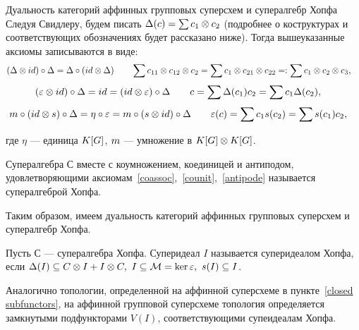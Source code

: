 \begin{subsection}{Дуальность категорий аффинных групповых суперсхем и супералгебр Хопфа}
  Следуя Свидлеру, будем писать $ \Delta(c) = \sum c_1 \otimes c_2 $ 
  (подробнее о коструктурах и соответствующих обозначениях будет рассказано ниже).
  Тогда вышеуказанные аксиомы записываются в виде:
  \begin{align*}
    (\Delta \otimes id) \circ \Delta = \Delta \circ (id \otimes \Delta) & \qquad
    \sum c_{11} \otimes c_{12} \otimes c_2 = \sum c_1 \otimes c_{21} \otimes c_{22} =: \sum c_1 \otimes c_2 \otimes c_3,
  \end{align*}
  \begin{align*}
    (\varepsilon \otimes id) \circ \Delta = id = (id \otimes \varepsilon) \circ \Delta & \qquad
    c = \sum \Delta(c_1) c_2 = \sum c_1 \Delta(c_2),
  \end{align*}
  \begin{align*}
    m \circ (id \otimes s) \circ \Delta = \eta \circ \varepsilon = m \circ (s \otimes id) \circ \Delta & \qquad
    \varepsilon (c) = \sum c_1 s(c_2) = \sum s(c_1) c_2,
  \end{align*}

  где $ \eta $ --- единица $ K[G] $, $ m $ --- умножение в $ K[G] \otimes K[G] $.

  \begin{definition}
    Супералгебра $ С $ вместе с коумножением, коединицей и антиподом,
    удовлетворяющими аксиомам~\ref{coassoc},~\ref{counit},~\ref{antipode}
    называется супералгеброй Хопфа.
  \end{definition}

  Таким образом, имеем дуальность категорий аффинных групповых суперсхем
  и супералгебр Хопфа.

  \begin{definition}
    Пусть $ С $ --- супералгебра Хопфа. Суперидеал $ I $ называется суперидеалом Хопфа,
    если $ \Delta (I) \subseteq C \otimes I + I \otimes C, ~I \subseteq \mathcal{M} = \ker\varepsilon, ~s(I) \subseteq I $.
  \end{definition}

  Аналогично топологии, определенной на аффинной суперсхеме
  в пункте~\ref{closed subfunctors}, на аффинной групповой суперсхеме
  топология определяется замкнутыми подфункторами $ V(I) $, соответствующими
  супеидеалам Хопфа.
  
\end{subsection}

